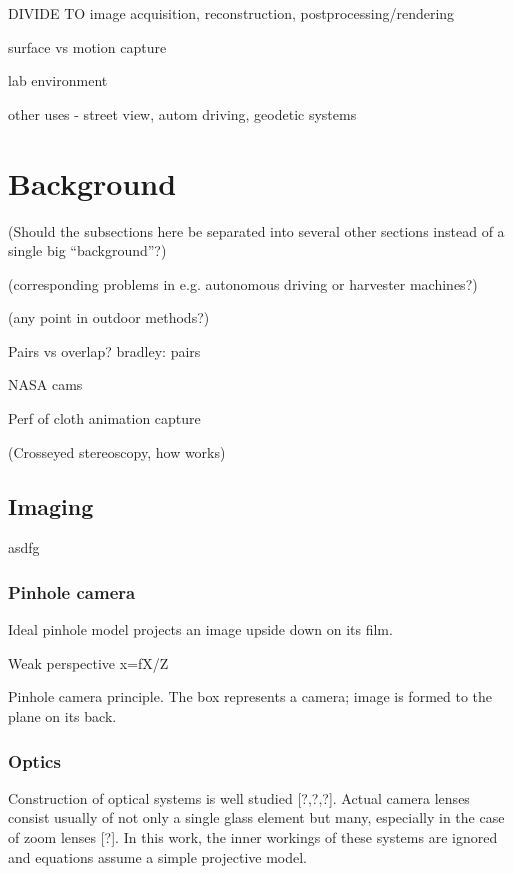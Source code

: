 DIVIDE TO image acquisition, reconstruction, postprocessing/rendering

surface vs motion capture

lab environment

other uses - street view, autom driving, geodetic systems

\section{Background}

(Should the subsections here be separated into several other sections instead of a single big ``background''?)

(corresponding problems in e.g. autonomous driving or harvester machines?)

(any point in outdoor methods?)

Pairs vs overlap? bradley: pairs

NASA cams

Perf of cloth animation capture

(Crosseyed stereoscopy, how works)

\subsection{Imaging}

asdfg

\subsubsection{Pinhole camera}

Ideal pinhole model projects an image upside down on its film.


Weak perspective x=fX/Z

{Pinhole camera principle. The box represents a camera; image is formed to the plane on its back.}

\subsubsection{Optics}

Construction of optical systems is well studied [?,?,?]. Actual camera lenses consist usually of not only a single glass element but many, especially in the case of zoom lenses [?]. In this work, the inner workings of these systems are ignored and equations assume a simple projective model.

